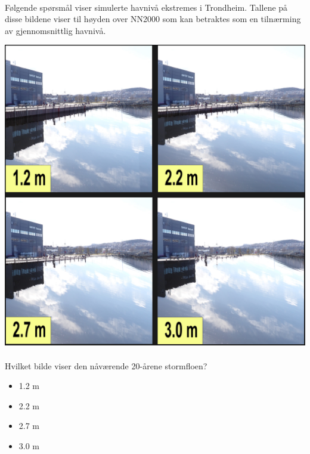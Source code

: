 \paragraph{}

Følgende spørsmål viser simulerte havnivå ekstremes i Trondheim. Tallene på disse bildene viser til høyden over NN2000 som kan betraktes som en tilnærming av gjennomsnittlig havnivå.

\includegraphics[width=1\textwidth]{fig_appendix/brattora 2090 q.png}
\paragraph{}
Hvilket bilde viser den nåværende 20-årene stormfloen?
\begin{itemize}
    \item 1.2 m
    \item 2.2 m
    \item 2.7 m
    \item 3.0 m
\end{itemize}
\paragraph{}

